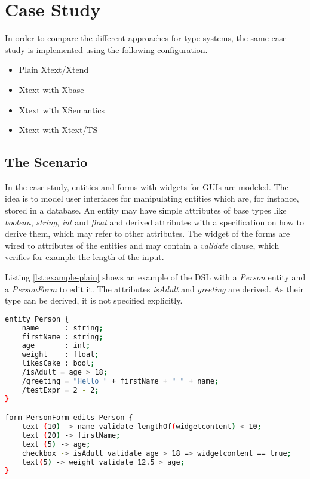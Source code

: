 \section{Case Study}

In order to compare the different approaches for type systems, the same case study is implemented using the following configuration.

\begin{itemize}
\item Plain Xtext/Xtend
\item Xtext with Xbase
\item Xtext with XSemantics
\item Xtext with Xtext/TS
\end{itemize}

\subsection{The Scenario}
In the case study, entities and forms with widgets for GUIs are modeled. The idea is to model user interfaces for manipulating entities which are, for instance, stored in a database. An entity may have simple attributes of base types like \emph{boolean}, \emph{string}, \emph{int} and \emph{float} and derived attributes with a specification on how to derive them, which may refer to other attributes. The widget of the forms are wired to attributes of the entities and may contain a \emph{validate} clause, which verifies for example the length of the input.

Listing \ref{lst:example-plain} shows an example of the DSL with a \emph{Person} entity and a \emph{PersonForm} to edit it. The attributes \emph{isAdult} and \emph{greeting} are derived. As their type can be derived, it is not specified explicitly.

%

\begin{lstlisting}[language=bash,float,label=lst:example-plain,caption=Forms and Entities DSL]
entity Person {
	name      : string;
	firstName : string;
	age       : int; 
	weight    : float;
	likesCake : bool; 
	/isAdult = age > 18;
	/greeting = "Hello " + firstName + " " + name;
	/testExpr = 2 - 2;
}

form PersonForm edits Person {
	text (10) -> name validate lengthOf(widgetcontent) < 10;
	text (20) -> firstName;
	text (5) -> age;
	checkbox -> isAdult validate age > 18 => widgetcontent == true;
	text(5) -> weight validate 12.5 > age;
}
\end{lstlisting}


